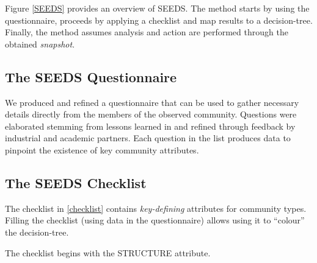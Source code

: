 Figure \ref{SEEDS} provides an overview of SEEDS. The method starts by using the questionnaire, proceeds by applying a checklist and map results to a decision-tree. Finally, the method assumes analysis and action are performed through the obtained \emph{snapshot}.

\subsection{The SEEDS Questionnaire}\label{quest}

We produced and refined a questionnaire that can be used to gather necessary details directly from the members of the observed community. Questions were elaborated stemming from lessons learned in \cite{specissue} and refined through feedback by industrial and academic partners. Each question in the list produces data to pinpoint the existence of key community attributes.

\subsection{The SEEDS Checklist}\label{cl}

The checklist in \ref{checklist} contains \emph{key-defining} attributes for community types. Filling the checklist (using data in the questionnaire) allows using it to ``colour'' the decision-tree.

The checklist begins with the STRUCTURE attribute. 


